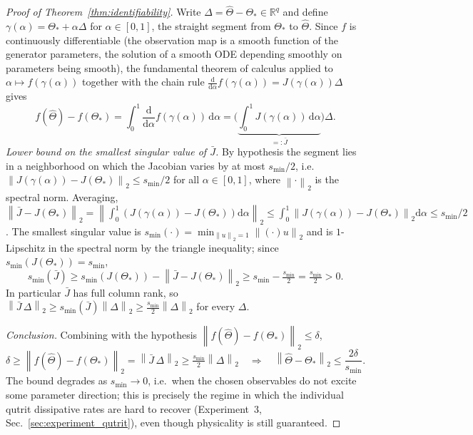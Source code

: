 \documentclass[11pt]{article}
\newcommand{\R}{\mathbb{R}}
\newcommand{\dd}{\mathrm{d}}
\newcommand{\norm}[1]{\left\lVert #1 \right\rVert}
\newcommand{\Thetahat}{\widehat{\Theta}}
\begin{document}
\begin{proof}[Proof of Theorem~\ref{thm:identifiability}]
Write $\Delta=\Thetahat-\Theta_*\in\R^q$ and define $\gamma(\alpha)=\Theta_*+\alpha\Delta$ for $\alpha\in[0,1]$, the straight segment from $\Theta_*$ to $\Thetahat$. Since $f$ is continuously differentiable (the observation map is a smooth function of the generator parameters, the solution of a smooth ODE depending smoothly on parameters being smooth), the fundamental theorem of calculus applied to $\alpha\mapsto f(\gamma(\alpha))$ together with the chain rule $\tfrac{\dd}{\dd\alpha}f(\gamma(\alpha))=J(\gamma(\alpha))\Delta$ gives
\[
f(\Thetahat)-f(\Theta_*)=\int_0^1\frac{\dd}{\dd\alpha}f(\gamma(\alpha))\,\dd\alpha=\Big(\underbrace{\int_0^1 J(\gamma(\alpha))\,\dd\alpha}_{=: \bar J}\Big)\Delta .
\]
\emph{Lower bound on the smallest singular value of $\bar J$.} By hypothesis the segment lies in a neighborhood on which the Jacobian varies by at most $s_{\min}/2$, i.e.\ $\norm{J(\gamma(\alpha))-J(\Theta_*)}_2\le s_{\min}/2$ for all $\alpha\in[0,1]$, where $\norm{\cdot}_2$ is the spectral norm. Averaging, $\norm{\bar J-J(\Theta_*)}_2=\norm{\int_0^1(J(\gamma(\alpha))-J(\Theta_*))\dd\alpha}_2\le\int_0^1\norm{J(\gamma(\alpha))-J(\Theta_*)}_2\dd\alpha\le s_{\min}/2$. The smallest singular value is $s_{\min}(\cdot)=\min_{\norm{u}_2=1}\norm{(\cdot)u}_2$ and is $1$-Lipschitz in the spectral norm by the triangle inequality; since $s_{\min}(J(\Theta_*))=s_{\min}$,
\[
s_{\min}(\bar J)\ge s_{\min}(J(\Theta_*))-\norm{\bar J-J(\Theta_*)}_2\ge s_{\min}-\tfrac{s_{\min}}{2}=\tfrac{s_{\min}}{2}>0.
\]
In particular $\bar J$ has full column rank, so $\norm{\bar J\,\Delta}_2\ge s_{\min}(\bar J)\norm{\Delta}_2\ge\tfrac{s_{\min}}{2}\norm{\Delta}_2$ for every $\Delta$.

\emph{Conclusion.} Combining with the hypothesis $\norm{f(\Thetahat)-f(\Theta_*)}_2\le\delta$,
\[
\delta\ge\norm{f(\Thetahat)-f(\Theta_*)}_2=\norm{\bar J\,\Delta}_2\ge\tfrac{s_{\min}}{2}\norm{\Delta}_2\quad\Longrightarrow\quad\norm{\Thetahat-\Theta_*}_2\le\frac{2\delta}{s_{\min}}.
\]
The bound degrades as $s_{\min}\to0$, i.e.\ when the chosen observables do not excite some parameter direction; this is precisely the regime in which the individual qutrit dissipative rates are hard to recover (Experiment~3, Sec.~\ref{sec:experiment_qutrit}), even though physicality is still guaranteed.
\end{proof}
\end{document}
